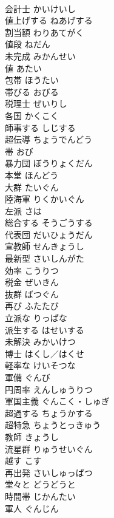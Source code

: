 \documentclass[8pt]{extreport}
\begin{document}
\begin{CJK}{UTF8}{min}
\\	会計士	かいけいし	
\\	値上げする	ねあげする	
\\	割当額	わりあてがく	
\\	値段	ねだん	
\\	未完成	みかんせい	
\\	値	あたい	
\\	包帯	ほうたい	
\\	帯びる	おびる	
\\	税理士	ぜいりし	
\\	各国	かくこく	
\\	師事する	しじする	
\\	超伝導	ちょうでんどう	
\\	帯	おび	
\\	暴力団	ぼうりょくだん	
\\	本堂	ほんどう	
\\	大群	たいぐん	
\\	陸海軍	りくかいぐん	
\\	左派	さは	
\\	総合する	そうごうする	
\\	代表団	だいひょうだん	
\\	宣教師	せんきょうし	
\\	最新型	さいしんがた	
\\	効率	こうりつ	
\\	税金	ぜいきん	
\\	抜群	ばつぐん	
\\	再び	ふたたび	
\\	立派な	りっぱな	
\\	派生する	はせいする	
\\	未解決	みかいけつ	
\\	博士	はくし／はくせ	
\\	軽率な	けいそつな	
\\	軍備	ぐんび	
\\	円周率	えんしゅうりつ	
\\	軍国主義	ぐんこく・しゅぎ	
\\	超過する	ちょうかする	
\\	超特急	ちょうとっきゅう	
\\	教師	きょうし	
\\	流星群	りゅうせいぐん	
\\	越す	こす	
\\	再出発	さいしゅっぱつ	
\\	堂々と	どうどうと	
\\	時間帯	じかんたい	
\\	軍人	ぐんじん	

\end{CJK}
\end{document}
